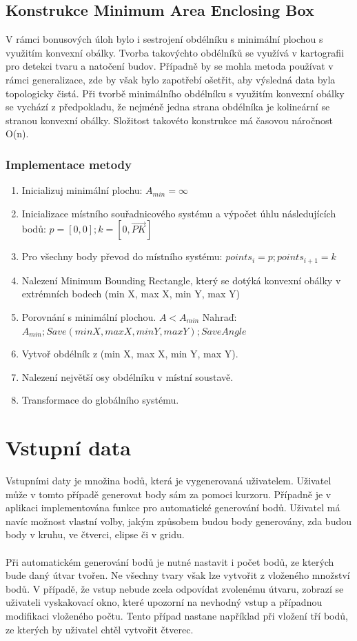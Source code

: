 \documentclass[a4paper, 12pt]{article}
\begin{document}
\subsection{Konstrukce Minimum Area Enclosing Box}
V rámci bonusových úloh bylo i sestrojení obdélníku s minimální plochou s využitím konvexní obálky. Tvorba takovýchto obdélníků se využívá v kartografii pro detekci tvaru a natočení budov. Případně by se mohla metoda používat v rámci generalizace, zde by však bylo zapotřebí ošetřit, aby výsledná data byla topologicky čistá. Při tvorbě minimálního obdélníku s využitím konvexní obálky se vychází z předpokladu, že nejméně jedna strana obdélníka je kolineární se stranou konvexní obálky. Složitost takovéto konstrukce má časovou náročnost O(n). 



\subsubsection{Implementace metody}
\begin{enumerate}
\item Inicializuj minimální plochu: $ A_{min} = \infty$
\item Inicializace místního souřadnicového systému a výpočet úhlu následujících bodů: $p=[0,0]; k=[0,\overrightarrow{PK}]$
\item Pro všechny body převod do místního systému: $points_i = p; points_{i+1} = k$
\item Nalezení Minimum Bounding Rectangle, který se dotýká konvexní obálky v extrémních bodech (min X, max X, min Y, max Y)
\item Porovnání s minimální plochou. $A < A_{min}$
\subitem Nahraď:$ A_{min}; Save (min X, max X, min Y, max Y); Save Angle $
\item Vytvoř obdélník z (min X, max X, min Y, max Y).
\item Nalezení největší osy obdélníku v místní soustavě.
\item Transformace do globálního systému.
\end{enumerate}



\section{Vstupní data}
Vstupními daty je množina bodů, která je vygenerovaná uživatelem. Uživatel může v tomto případě generovat body sám za pomoci kurzoru. Případně je v aplikaci implementována funkce pro automatické generování bodů. Uživatel má navíc možnost vlastní volby, jakým způsobem budou body generovány, zda budou body v kruhu, ve čtverci, elipse či v gridu. \\
\\
Při automatickém generování bodů je nutné nastavit i počet bodů, ze kterých bude daný útvar tvořen. Ne všechny tvary však lze vytvořit z vloženého množství bodů. V případě, že vstup nebude zcela odpovídat zvolenému útvaru, zobrazí se uživateli vyskakovací okno, které upozorní na nevhodný vstup a případnou modifikaci vloženého počtu. Tento případ nastane například při vložení tří bodů, ze kterých by uživatel chtěl vytvořit čtverec. 
\end{document}
